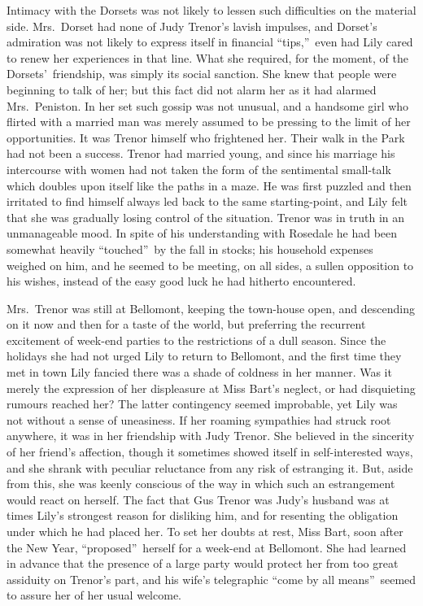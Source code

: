 \documentclass[12pt,a4paper]{book}
\begin{document}
Intimacy with the Dorsets was not likely to lessen such
difficulties on the material side. Mrs.\ Dorset had none of Judy
Trenor's lavish impulses, and Dorset's admiration was not likely
to express itself in financial ``tips,''\ even had Lily cared to
renew her experiences in that line. What she required, for the
moment, of the Dorsets'\ friendship, was simply its social
sanction. She knew that people were beginning to talk of her; but
this fact did not alarm her as it had alarmed Mrs.\ Peniston. In
her set such gossip was not unusual, and a handsome girl who
flirted with a married man was merely assumed to be pressing to
the limit of her opportunities. It was Trenor himself who
frightened her. Their walk in the Park had not been a success. 
Trenor had married young, and since his marriage his intercourse
with women had not taken the form of the sentimental small-talk
which doubles upon itself like the paths in a maze. He was first
puzzled and then irritated to find himself always led back to the
same starting-point, and Lily felt that she was gradually losing
control of the situation. Trenor was in truth in an unmanageable
mood. In spite of his understanding with Rosedale he had been
somewhat heavily ``touched''\ by the fall in stocks; his household
expenses weighed on him, and he seemed to be meeting, on all
sides, a sullen opposition to his wishes, instead of the easy
good luck he had hitherto encountered.





Mrs.\ Trenor was still at Bellomont, keeping the town-house open,
and descending on it now and then for a taste of the world, but
preferring the recurrent excitement of week-end parties to the
restrictions of a dull season. Since the holidays she had not
urged Lily to return to Bellomont, and the first time they met in
town Lily fancied there was a shade of coldness in her manner. 
Was it merely the expression of her displeasure at Miss Bart's
neglect, or had disquieting rumours reached her? The latter
contingency seemed improbable, yet Lily was not without a sense
of uneasiness. If her roaming sympathies had struck root
anywhere, it was in her friendship with Judy Trenor. She believed
in the sincerity of her friend's affection, though it sometimes
showed itself in self-interested ways, and she shrank with
peculiar reluctance from any risk of estranging it. But, aside
from this, she was keenly conscious of the way in which such an
estrangement would react on herself. The fact that Gus Trenor was
Judy's husband was at times Lily's strongest reason for disliking
him, and for resenting the obligation under which he had placed
her. To set her doubts at rest, Miss Bart, soon after the New
Year, ``proposed''\ herself for a week-end at Bellomont. She had
learned in advance that the presence of a large party
would protect her from too great assiduity on Trenor's part, and
his wife's telegraphic ``come by all means''\ seemed to assure her
of her usual welcome.
\end{document}
